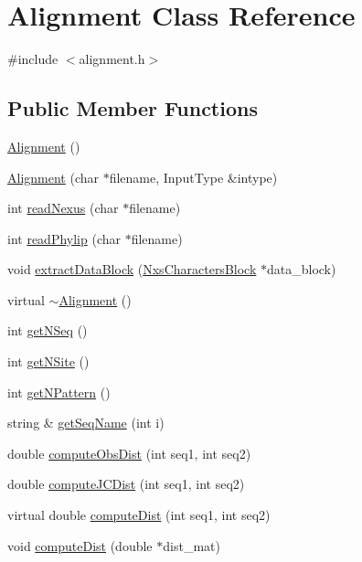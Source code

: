 \hypertarget{classAlignment}{
\section{Alignment Class Reference}
\label{classAlignment}
}


{\ttfamily \#include $<$alignment.h$>$}\subsection*{Public Member Functions}
\begin{DoxyCompactItemize}
\item 
\hyperlink{classAlignment_a091e21f0cfb741cb5cdc3535c6cc287f}{Alignment} ()
\item 
\hyperlink{classAlignment_ad8ea66351921a99a02377e22062e54cb}{Alignment} (char $\ast$filename, InputType \&intype)
\item 
int \hyperlink{classAlignment_a50c61ad1efb041f9e0039d5293646b15}{readNexus} (char $\ast$filename)
\item 
int \hyperlink{classAlignment_a5d924570d1b019b734c9d30f35d1dd2e}{readPhylip} (char $\ast$filename)
\item 
void \hyperlink{classAlignment_abb4dfacef5d00ca51f214e21dfae2df3}{extractDataBlock} (\hyperlink{classNxsCharactersBlock}{NxsCharactersBlock} $\ast$data\_\-block)
\item 
virtual \hyperlink{classAlignment_a8787573a5060136c2a51f40cf229e356}{$\sim$Alignment} ()
\item 
int \hyperlink{classAlignment_ab897ce9c1a93577daa9934e906f7d6cd}{getNSeq} ()
\item 
int \hyperlink{classAlignment_a218c888333e7e7d35c44c3b554cf5716}{getNSite} ()
\item 
int \hyperlink{classAlignment_ab070fcbe981bdc38800a79066c770ddc}{getNPattern} ()
\item 
string \& \hyperlink{classAlignment_a88395c4218d679f68f7d8e74fb85ca9d}{getSeqName} (int i)
\item 
double \hyperlink{classAlignment_a87ce6b02455c75e5de5125dc3e491e05}{computeObsDist} (int seq1, int seq2)
\item 
double \hyperlink{classAlignment_a0be957c6fb7af20dc675f28969487131}{computeJCDist} (int seq1, int seq2)
\item 
virtual double \hyperlink{classAlignment_a88a4b45ead6d8f22c0416cfa01037049}{computeDist} (int seq1, int seq2)
\item 
void \hyperlink{classAlignment_ab6042ffe567a6b036b1715621bbe60d0}{computeDist} (double $\ast$dist\_\-mat)

\end{DoxyCompactItemize}
